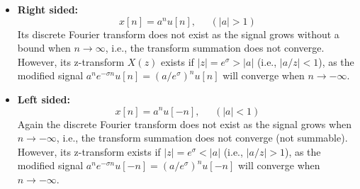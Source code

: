 \begin{itemize}
\item {\bf Right sided:}
\[	x[n]=a^n u[n],\;\;\;\;\;(|a|>1)	\]
Its discrete Fourier transform does not exist as the signal grows without
a bound when $n\rightarrow \infty$, i.e., the transform summation does not 
converge. However, its z-transform $X(z)$ exists if $|z|=e^\sigma>|a|$ 
(i.e., $|a/z|<1$), as the modified signal 
$a^n e^{-\sigma n} u[n]=(a/e^\sigma)^n u[n]$ will converge when 
$n\rightarrow -\infty$.

\item {\bf Left sided:}
\[	x[n]=a^n u[-n],\;\;\;\;\;(|a|<1)	\]
Again the discrete Fourier transform does not exist as the signal grows when
$n\rightarrow -\infty$, i.e., the transform summation does not converge (not
summable). However, its z-transform exists if $|z|=e^\sigma<|a|$ (i.e., 
$|a/z|>1$), as the modified signal 
$a^n e^{-\sigma n} u[-n]=(a/e^\sigma)^n u[-n]$ will converge when 
$n\rightarrow -\infty$.
\end{itemize}

\newpage
